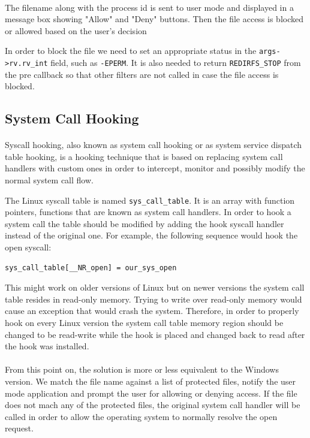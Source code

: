 	\paragraph{}
	The filename along with the process id is sent to user mode and displayed in a message box showing "Allow" and "Deny" buttons. Then the file access is blocked or allowed based on the user's decision
	
	In order to block the file we need to set an appropriate status in the \texttt{args->rv.rv\_int} field, such as \texttt{-EPERM}. It is also needed to return \texttt{REDIRFS\_STOP} from the pre callback so that other filters are not called in case the file access is blocked.
	
	\subsection{System Call Hooking}
	\paragraph{} 
	Syscall hooking, also known as system call hooking or as system service dispatch table hooking, is a hooking technique that is based on replacing system call handlers with custom ones in order to intercept, monitor and possibly modify the normal system call flow.
	
	The Linux syscall table is named \texttt{sys\_call\_table}. It is an array with function pointers, functions that are known as system call handlers. In order to hook a system call the table should be modified by adding the hook syscall handler instead of the original one. For example, the following sequence would hook the open syscall:
	
	\begin{Verbatim}[fontsize=\small, commandchars=\\\{\}]
	sys_call_table[__NR_open] = our_sys_open
	\end{Verbatim}
	
	This might work on older versions of Linux but on newer versions the system call table resides in read-only memory. Trying to write over read-only memory would cause an exception that would crash the system. Therefore, in order to properly hook on every Linux version the system call table memory region should be changed to be read-write while the hook is placed and changed back to read after the hook was installed. 
	
	\paragraph{}
	From this point on, the solution is more or less equivalent to the Windows version. We match the file name against a list of protected files, notify the user mode application and prompt the user for allowing or denying access. If the file does not mach any of the protected files, the original system call handler will be called in order to allow the operating system to normally resolve the open request.
	
